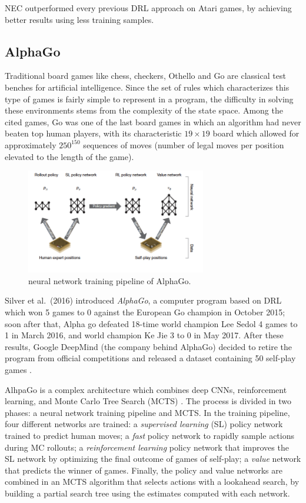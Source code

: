 NEC outperformed every previous DRL approach on Atari games, by achieving better
results using less training samples.

\subsection{AlphaGo}
Traditional board games like chess, checkers, Othello and Go are classical 
test benches for artificial intelligence. Since the set of rules which
characterizes this type of games is fairly simple to represent in a program, the
difficulty in solving these environments stems from the complexity of the 
state space. Among the cited games, Go was one of the last board games in which 
an algorithm had never beaten top human players, with its characteristic 
$19 \times 19$ board which allowed for approximately $250^{150}$ sequences of
moves (number of legal moves per position elevated to the length of the game).
%
\begin{figure}[h]
\includegraphics[width=0.7\textwidth]{pictures/alphago}
\centering
\caption{neural network training pipeline of AlphaGo.}
\end{figure}
%
Silver et al.\ (2016) \cite{silver2016mastering} introduced \textit{AlphaGo}, 
a computer program based on DRL which won 5 games to 0 against the European Go 
champion in October 2015; soon after that, Alpha go defeated 18-time world 
champion Lee Sedol 4 games to 1 in March 2016, and world champion Ke Jie 3 to 0 
in May 2017. After these results, Google DeepMind (the company behind 
AlphaGo) decided to retire the program from official competitions and released a
dataset containing 50 self-play games \cite{alphago}.

AlhpaGo is a complex architecture which combines deep CNNs, reinforcement 
learning, and Monte Carlo Tree Search (MCTS) \cite{browne2012survey, gelly2012grand}. 
The process is divided in two phases: a neural network training pipeline and 
MCTS. In the training pipeline, four different networks are trained: a 
\textit{supervised learning} (SL) policy network trained to predict human moves;
a \textit{fast} policy network to rapidly sample actions during MC rollouts; a 
\textit{reinforcement learning} policy network that improves the SL network by 
optimizing the final outcome of games of self-play; a \textit{value} network 
that predicts the winner of games. Finally, the policy and value networks are 
combined in an MCTS algorithm that selects actions with a lookahead search, by 
building a partial search tree using the estimates computed with each network.

